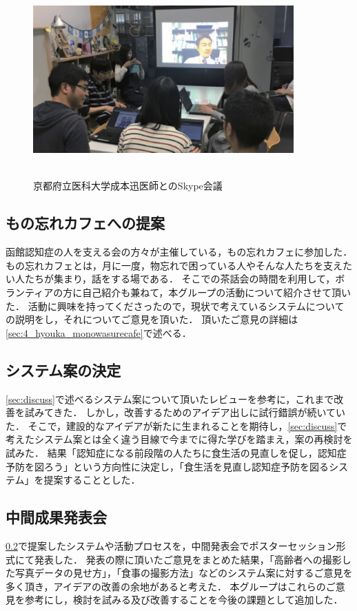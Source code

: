 \documentclass[../report]{subfiles}
\begin{document}
\begin{figure}[htbp]
    \begin{center}
        \includegraphics[width=10cm]{imgs/2_idea_review2.png}
        \caption{京都府立医科大学成本迅医師とのSkype会議}
    \end{center}
\end{figure}

\subsection{もの忘れカフェへの提案} \label{sec:propose_cafe}
函館認知症の人を支える会の方々が主催している，もの忘れカフェに参加した．
もの忘れカフェとは，月に一度，物忘れで困っている人やそんな人たちを支えたい人たちが集まり，話をする場である．
そこでの茶話会の時間を利用して，ボランティアの方に自己紹介も兼ねて，本グループの活動について紹介させて頂いた．
活動に興味を持ってくださったので，現状で考えているシステムについての説明をし，それについてご意見を頂いた．
頂いたご意見の詳細は\ref{sec:4_hyouka_monowasurecafe}で述べる．

\subsection{システム案の決定} \label{sec:decision}
\ref{sec:discuss}で述べるシステム案について頂いたレビューを参考に，これまで改善を試みてきた．
しかし，改善するためのアイデア出しに試行錯誤が続いていた．
そこで，建設的なアイデアが新たに生まれることを期待し，\ref{sec:discuss}で考えたシステム案とは全く違う目線で今までに得た学びを踏まえ，案の再検討を試みた．
結果「認知症になる前段階の人たちに食生活の見直しを促し，認知症予防を図ろう」という方向性に決定し，「食生活を見直し認知症予防を図るシステム」を提案することとした．

\subsection{中間成果発表会}
\ref{sec:decision}で提案したシステムや活動プロセスを，中間発表会でポスターセッション形式にて発表した．
発表の際に頂いたご意見をまとめた結果，「高齢者への撮影した写真データの見せ方」，「食事の撮影方法」などのシステム案に対するご意見を多く頂き，アイデアの改善の余地があると考えた．
本グループはこれらのご意見を参考にし，検討を試みる及び改善することを今後の課題として追加した．
\end{document}
